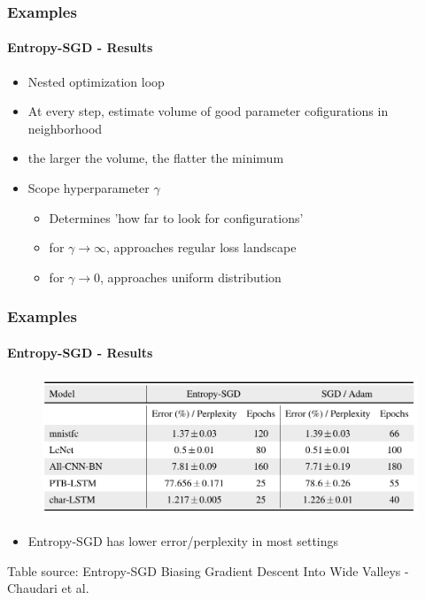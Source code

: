 \documentclass[9pt]{beamer}
\begin{document}
\begin{frame}
\frametitle{Examples}
\framesubtitle{Entropy-SGD - Results}
\begin{itemize}
	\item Nested optimization loop
	\item At every step, estimate volume of good parameter cofigurations in neighborhood
	\item the larger the volume, the flatter the minimum
	\item Scope hyperparameter $\gamma$
	\begin{itemize}
			\item Determines 'how far to look for configurations'
		\item for $\gamma \rightarrow \infty$, approaches regular loss landscape
		\item for $\gamma \rightarrow 0$, approaches uniform distribution
	\end{itemize}
\end{itemize}
\end{frame}




\begin{frame}
\frametitle{Examples}
\framesubtitle{Entropy-SGD - Results}
\begin{figure}
	\includegraphics[width=.9\linewidth]{figures/entropy_results.png}
\end{figure}
\begin{itemize}%
	\item Entropy-SGD has lower error/perplexity in most settings 
\end{itemize}
\tiny\color{lightgray}Table source: Entropy-SGD Biasing Gradient Descent Into Wide Valleys - Chaudari et al.
\end{frame}
\end{document}
